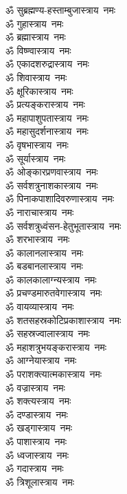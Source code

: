 \begin{flushleft}
\begin{multicols}{2}
ॐ सुब्रह्मण्य-हस्ताम्बुजास्त्राय~नमः\\
ॐ गुहास्त्राय~नमः\\
ॐ ब्रह्मास्त्राय~नमः\\
ॐ विष्ण्वास्त्राय~नमः\\
ॐ एकादशरुद्रास्त्राय~नमः\\
ॐ शिवास्त्राय~नमः\\
ॐ क्षूरिकास्त्राय~नमः\\
ॐ प्रत्यङ्करास्त्राय~नमः\\
ॐ महापाशुपतास्त्राय~नमः\\
ॐ महासुदर्शनास्त्राय~नमः\hfill{}\\
ॐ वृषभास्त्राय~नमः\\
ॐ सूर्यास्त्राय~नमः\\
ॐ ओङ्कारप्रणवास्त्राय~नमः\\
ॐ सर्वशत्रुनाशकास्त्राय~नमः\\
ॐ पिनाकपाशादिवरुणास्त्राय~नमः\\
ॐ नाराचास्त्राय~नमः\\
ॐ सर्वशत्रुध्वंसन-हेतुभूतास्त्राय~नमः\\
ॐ शरभास्त्राय~नमः\\
ॐ कालानलास्त्राय~नमः\\
ॐ बडबानलास्त्राय~नमः \hfill{}\\
ॐ कालकालाग्न्यस्त्राय~नमः\\
ॐ प्रचण्डमारुतवेगास्त्राय~नमः\\
ॐ वायव्यास्त्राय~नमः\\
ॐ शतसहस्रकोटिप्रकाशास्त्राय~नमः\\
ॐ सहस्रज्वालास्त्राय~नमः\\
ॐ महाशत्रुभयङ्करास्त्राय~नमः\\
ॐ आग्नेयास्त्राय~नमः\\
ॐ पराशक्त्यात्मकास्त्राय~नमः\\
ॐ वज्रास्त्राय~नमः\\
ॐ शक्त्यस्त्राय~नमः\hfill{}\\
ॐ दण्डास्त्राय~नमः\\
ॐ खड्गास्त्राय~नमः\\
ॐ पाशास्त्राय~नमः\\
ॐ ध्वजास्त्राय~नमः\\
ॐ गदास्त्राय~नमः\\
ॐ त्रिशूलास्त्राय~नमः\\

\end{multicols}
\end{flushleft}
